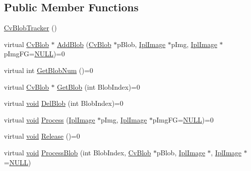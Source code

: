 \subsection*{Public Member Functions}
\begin{DoxyCompactItemize}
\item 
\hyperlink{classCvBlobTracker_a98c55cd2e9c733e2de69e3055b0f0785}{Cv\-Blob\-Tracker} ()
\item 
virtual \hyperlink{structCvBlob}{Cv\-Blob} $\ast$ \hyperlink{classCvBlobTracker_ae6e9e1625419a492e98fd9a68079d1b4}{Add\-Blob} (\hyperlink{structCvBlob}{Cv\-Blob} $\ast$p\-Blob, \hyperlink{core_2types__c_8h_a249298f383f3b430b476542076320c57}{Ipl\-Image} $\ast$p\-Img, \hyperlink{core_2types__c_8h_a249298f383f3b430b476542076320c57}{Ipl\-Image} $\ast$p\-Img\-F\-G=\hyperlink{Config_8cpp_a070d2ce7b6bb7e5c05602aa8c308d0c4}{N\-U\-L\-L})=0
\item 
virtual int \hyperlink{classCvBlobTracker_a9c1bec9e250b3581e6913422a6c4e262}{Get\-Blob\-Num} ()=0
\item 
virtual \hyperlink{structCvBlob}{Cv\-Blob} $\ast$ \hyperlink{classCvBlobTracker_aba635bf14a257549d644dc5353981c49}{Get\-Blob} (int Blob\-Index)=0
\item 
virtual \hyperlink{legacy_8hpp_a8bb47f092d473522721002c86c13b94e}{void} \hyperlink{classCvBlobTracker_a231ed3f4715461353a38d071c0ef6ba8}{Del\-Blob} (int Blob\-Index)=0
\item 
virtual \hyperlink{legacy_8hpp_a8bb47f092d473522721002c86c13b94e}{void} \hyperlink{classCvBlobTracker_a7f4f77190046dc8519d34682a90bb47e}{Process} (\hyperlink{core_2types__c_8h_a249298f383f3b430b476542076320c57}{Ipl\-Image} $\ast$p\-Img, \hyperlink{core_2types__c_8h_a249298f383f3b430b476542076320c57}{Ipl\-Image} $\ast$p\-Img\-F\-G=\hyperlink{Config_8cpp_a070d2ce7b6bb7e5c05602aa8c308d0c4}{N\-U\-L\-L})=0
\item 
virtual \hyperlink{legacy_8hpp_a8bb47f092d473522721002c86c13b94e}{void} \hyperlink{classCvBlobTracker_a9bb9997ccde71910386f99b52f166a40}{Release} ()=0
\item 
virtual \hyperlink{legacy_8hpp_a8bb47f092d473522721002c86c13b94e}{void} \hyperlink{classCvBlobTracker_ace6cefee2f1ad1b569aec1e8fbc2ea82}{Process\-Blob} (int Blob\-Index, \hyperlink{structCvBlob}{Cv\-Blob} $\ast$p\-Blob, \hyperlink{core_2types__c_8h_a249298f383f3b430b476542076320c57}{Ipl\-Image} $\ast$, \hyperlink{core_2types__c_8h_a249298f383f3b430b476542076320c57}{Ipl\-Image} $\ast$=\hyperlink{Config_8cpp_a070d2ce7b6bb7e5c05602aa8c308d0c4}{N\-U\-L\-L})
\item 

\end{DoxyCompactItemize}

